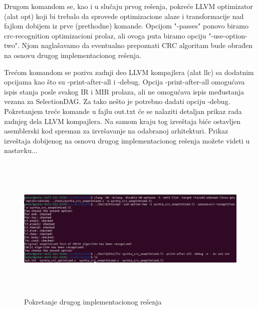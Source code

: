 \documentclass[12pt,oneside]{memoir}
\begin{document}
Drugom komandom se, kao i u slučaju prvog rešenja, pokreće LLVM optimizator (alat opt) koji bi 
trebalo da sprovede optimizacione alaze i transformacije nad fajlom dobijem iz prve (prethodne) 
komande. Opcijom "-passes" ponovo biramo crc-recognition optimizacioni prolaz, ali ovoga puta 
biramo opciju "-use-option-two". Njom naglašavamo da eventualno prepoznati CRC algoritam bude 
obrađen na osnovu drugog implementacionog rešenja.

Trećom komandom se poziva zadnji deo LLVM kompajlera (alat llc) sa dodatnim opcijama kao što su 
-print-after-all i -debug. Opcija -print-after-all omogućava ispis stanja posle svakog IR i MIR 
prolaza, ali ne omogućava ispis međustanja vezana za SelectionDAG. Za tako nešto je potrebno 
dadati opciju -debug. 
Pokretanjem treće komande u fajlu out.txt će se nalaziti detaljan prikaz rada zadnjeg dela LLVM 
kompajlera. Na samom kraju tog izveštaja biće ostavljen asemblerski kod spreman za izvršavanje na 
odabranoj arhitekturi. Prikaz izveštaja dobijenog na osnovu drugog implementacionog rešenja 
možete videti u nastavku...

\begin{figure}
\includegraphics[width=\textwidth, height=7cm]{testing_2nd_impl}
\caption{Pokretanje drugog implementacionog rešenja}
\end{figure}



\end{document}
